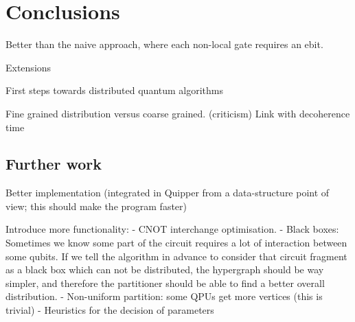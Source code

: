 \chapter{Conclusions}
\label{chap:Conclusions}

Better than the naive approach, where each non-local gate requires an ebit.

Extensions

First steps towards distributed quantum algorithms

Fine grained distribution versus coarse grained. (criticism) Link with decoherence time

\section{Further work}
\label{FurtherWork}

Better implementation (integrated in Quipper from a data-structure point of view; this should make the program faster)

Introduce more functionality:
  - CNOT interchange optimisation.
  - Black boxes: Sometimes we know some part of the circuit requires a lot of interaction between some qubits. If we tell the algorithm in advance to consider that circuit fragment as a black box which can not be distributed, the hypergraph should be way simpler, and therefore the partitioner should be able to find a better overall distribution.
  - Non-uniform partition: some QPUs get more vertices (this is trivial)
  - Heuristics for the decision of parameters
